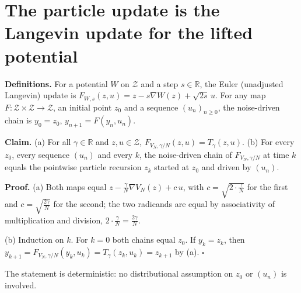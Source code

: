 \documentclass[11pt,a4paper]{article}
\begin{document}
\section{\texorpdfstring{The particle update is the Langevin update for the lifted potential}{The particle update is the Langevin update for the lifted potential}}


\textbf{Definitions.} For a potential \(W\) on \(\mathcal Z\) and a step \(s\in\mathbb R\), the Euler (unadjusted Langevin) update is \(F_{W,s}(z,u)=z-s\nabla W(z)+\sqrt{2s}\,u\). For any map \(F:\mathcal Z\times\mathcal Z\to\mathcal Z\), an initial point \(z_0\) and a sequence \((u_n)_{n\ge0}\), the noise-driven chain is \(y_0=z_0\), \(y_{n+1}=F(y_n,u_n)\).




\textbf{Claim.} (a) For all \(\gamma\in\mathbb R\) and \(z,u\in\mathcal Z\), \(F_{V_N,\gamma/N}(z,u)=T_\gamma(z,u)\). (b) For every \(z_0\), every sequence \((u_n)\) and every \(k\), the noise-driven chain of \(F_{V_N,\gamma/N}\) at time \(k\) equals the pointwise particle recursion \(z_k\) started at \(z_0\) and driven by \((u_n)\).




\textbf{Proof.} (a) Both maps equal \(z-\frac\gamma N\nabla V_N(z)+c\,u\), with \(c=\sqrt{2\cdot\frac\gamma N}\) for the first and \(c=\sqrt{\frac{2\gamma}N}\) for the second; the two radicands are equal by associativity of multiplication and division, \(2\cdot\frac\gamma N=\frac{2\gamma}N\).




(b) Induction on \(k\). For \(k=0\) both chains equal \(z_0\). If \(y_k=z_k\), then \(y_{k+1}=F_{V_N,\gamma/N}(y_k,u_k)=T_\gamma(z_k,u_k)=z_{k+1}\) by (a). \(\square\)




The statement is deterministic: no distributional assumption on \(z_0\) or \((u_n)\) is involved.
\end{document}
